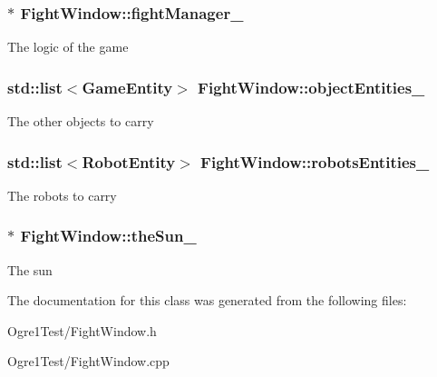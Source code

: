 \subsubsection[{\texorpdfstring{fight\+Manager\+\_\+}{fightManager_}}]{$\ast$ Fight\+Window\+::fight\+Manager\+\_\+\hspace{0.3cm}{\ttfamily [protected]}}\hypertarget{class_fight_window_a5353954a2361e6ecd1a91f2882c6ed76}{}\label{class_fight_window_a5353954a2361e6ecd1a91f2882c6ed76}
The logic of the game 
\subsubsection[{\texorpdfstring{object\+Entities\+\_\+}{objectEntities_}}]{\setlength{\rightskip}{0pt plus 5cm}std\+::list$<${\bf Game\+Entity}$>$ Fight\+Window\+::object\+Entities\+\_\+\hspace{0.3cm}{\ttfamily [protected]}}\hypertarget{class_fight_window_af9ed710d89b1a0a0ab326d3bcd55a072}{}\label{class_fight_window_af9ed710d89b1a0a0ab326d3bcd55a072}
The other objects to carry 
\subsubsection[{\texorpdfstring{robots\+Entities\+\_\+}{robotsEntities_}}]{\setlength{\rightskip}{0pt plus 5cm}std\+::list$<${\bf Robot\+Entity}$>$ Fight\+Window\+::robots\+Entities\+\_\+\hspace{0.3cm}{\ttfamily [protected]}}\hypertarget{class_fight_window_a07cdb20ba127910023e0bd45f4b007a8}{}\label{class_fight_window_a07cdb20ba127910023e0bd45f4b007a8}
The robots to carry 
\subsubsection[{\texorpdfstring{the\+Sun\+\_\+}{theSun_}}]{$\ast$ Fight\+Window\+::the\+Sun\+\_\+\hspace{0.3cm}{\ttfamily [protected]}}\hypertarget{class_fight_window_ac0efa5268674b08d31c3adc7dc3ab7a3}{}\label{class_fight_window_ac0efa5268674b08d31c3adc7dc3ab7a3}
The sun 

The documentation for this class was generated from the following files\+:\begin{DoxyCompactItemize}
\item 
Ogre1\+Test/Fight\+Window.\+h\item 
Ogre1\+Test/Fight\+Window.\+cpp\end{DoxyCompactItemize}
